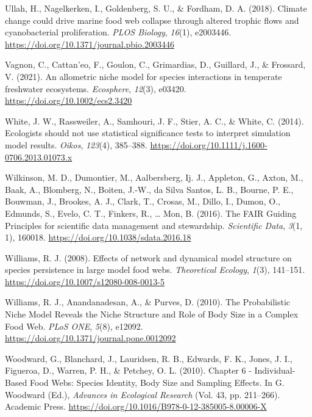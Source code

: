 \documentclass{article}
\newlength{\cslhangindent}
\newlength{\cslentryspacingunit} %
\newenvironment{CSLReferences}[2] %
 {%
  \setlength{\parindent}{0pt}
  \ifodd #1
  \let\oldpar\par
  \def\par{\hangindent=\cslhangindent\oldpar}
  \fi
  \setlength{\parskip}{#2\cslentryspacingunit}
 }%
 {}
\begin{document}
\begin{CSLReferences}{1}{0}
\leavevmode{}%
Ullah, H., Nagelkerken, I., Goldenberg, S. U., \& Fordham, D. A. (2018).
Climate change could drive marine food web collapse through altered
trophic flows and cyanobacterial proliferation. \emph{PLOS Biology},
\emph{16}(1), e2003446.
\url{https://doi.org/10.1371/journal.pbio.2003446}

\leavevmode{}%
Vagnon, C., Cattan'eo, F., Goulon, C., Grimardias, D., Guillard, J., \&
Frossard, V. (2021). An allometric niche model for species interactions
in temperate freshwater ecosystems. \emph{Ecosphere}, \emph{12}(3),
e03420. \url{https://doi.org/10.1002/ecs2.3420}

\leavevmode{}%
White, J. W., Rassweiler, A., Samhouri, J. F., Stier, A. C., \& White,
C. (2014). Ecologists should not use statistical significance tests to
interpret simulation model results. \emph{Oikos}, \emph{123}(4),
385--388. \url{https://doi.org/10.1111/j.1600-0706.2013.01073.x}

\leavevmode{}%
Wilkinson, M. D., Dumontier, M., Aalbersberg, Ij. J., Appleton, G.,
Axton, M., Baak, A., Blomberg, N., Boiten, J.-W., da Silva Santos, L.
B., Bourne, P. E., Bouwman, J., Brookes, A. J., Clark, T., Crosas, M.,
Dillo, I., Dumon, O., Edmunds, S., Evelo, C. T., Finkers, R., \ldots{}
Mon, B. (2016). The {FAIR Guiding Principles} for scientific data
management and stewardship. \emph{Scientific Data}, \emph{3}(1, 1),
160018. \url{https://doi.org/10.1038/sdata.2016.18}

\leavevmode{}%
Williams, R. J. (2008). Effects of network and dynamical model structure
on species persistence in large model food webs. \emph{Theoretical
Ecology}, \emph{1}(3), 141--151.
\url{https://doi.org/10.1007/s12080-008-0013-5}

\leavevmode{}%
Williams, R. J., Anandanadesan, A., \& Purves, D. (2010). The
{Probabilistic Niche Model Reveals} the {Niche Structure} and {Role} of
{Body Size} in a {Complex Food Web}. \emph{PLoS ONE}, \emph{5}(8),
e12092. \url{https://doi.org/10.1371/journal.pone.0012092}

\leavevmode{}%
Woodward, G., Blanchard, J., Lauridsen, R. B., Edwards, F. K., Jones, J.
I., Figueroa, D., Warren, P. H., \& Petchey, O. L. (2010). Chapter 6 -
{Individual-Based Food Webs}: {Species Identity}, {Body Size} and
{Sampling Effects}. In G. Woodward (Ed.), \emph{Advances in {Ecological
Research}} (Vol. 43, pp. 211--266). {Academic Press}.
\url{https://doi.org/10.1016/B978-0-12-385005-8.00006-X}

\end{CSLReferences}



\end{document}
